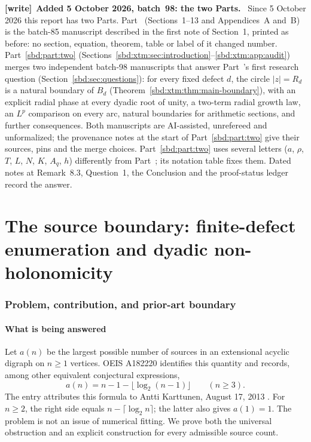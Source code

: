 \documentclass[11pt,a4paper]{article}
\theoremstyle{definition}
\newenvironment{writenote}[1][]{\par\smallskip\begingroup\small
 \noindent\textbf{[write]}\if\relax\detokenize{#1}\relax\else~\textbf{#1.}\fi\ }%
 {\par\endgroup\smallskip}
\begin{document}
\begin{writenote}[Added 5 October 2026, batch~98: the two Parts]
Since 5 October 2026 this report has two Parts. Part~\ref{sbd:part:one}
(Sections~1--13 and Appendices~A and~B) is the batch-85 manuscript
described in the first note of Section~1, printed as before: no section,
equation, theorem, table or label of it changed number. Part~\ref{sbd:part:two}
(Sections~\ref{sbd:xtm:sec:introduction}--\ref{sbd:xtm:app:audit}) merges two
independent batch-98 manuscripts that answer Part~\ref{sbd:part:one}'s
first research question (Section~\ref{sbd:sec:questions}): for every fixed
defect $d$, the circle $|z|=R_d$ is a natural boundary of $B_d$
(Theorem~\ref{sbd:xtm:thm:main-boundary}), with an explicit radial phase at
every dyadic root of unity, a two-term radial growth law, an $L^p$
comparison on every arc, natural boundaries for arithmetic sections, and
further consequences. Both manuscripts are AI-assisted, unrefereed and
unformalized; the provenance notes at the start of
Part~\ref{sbd:part:two} give their sources, pins and the merge choices.
Part~\ref{sbd:part:two} uses several letters ($a$, $\rho$, $T$, $L$, $N$,
$K$, $A_q$, $h$) differently from Part~\ref{sbd:part:one}; its notation table
fixes them. Dated notes at Remark~8.3, Question~1, the Conclusion and the
proof-status ledger record the answer.
\end{writenote}

{\small\setlength{\parskip}{0pt}\tableofcontents}
\newpage

\part{The source boundary: finite-defect enumeration and dyadic non-holonomicity}\label{sbd:part:one}

\section{Problem, contribution, and prior-art boundary}

\subsection{What is being answered}
Let $a(n)$ be the largest possible number of sources in an extensional
acyclic digraph on $n\ge1$ vertices. OEIS A182220 identifies this quantity
and records, among other equivalent conjectural expressions,
\begin{equation}\label{sbd:eq:oeis-conjecture}
 a(n)=n-1-\lfloor\log_2(n-1)\rfloor\qquad(n\ge3).
\end{equation}
The entry attributes this formula to Antti Karttunen, August 17, 2013
\cite{oeis220}. For $n\ge2$, the right side equals
$n-\lceil\log_2n\rceil$; the latter also gives $a(1)=1$.
The problem is not an issue of numerical fitting. We prove both the
universal obstruction and an explicit construction for every admissible
source count.
\end{document}
